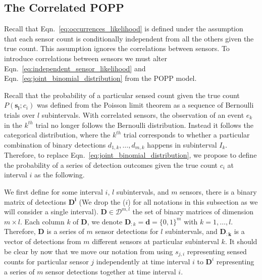 
\subsection{The Correlated POPP}
\label{subsec:cpop}

Recall that Eqn.~\ref{eq:occurrences_likelihood} is defined under the assumption that each sensor count is conditionally independent from all the others given the true count. This assumption ignores the correlations between sensors. 
% 
To introduce correlations between sensors we must alter Eqn.~\ref{eq:independent_sensor_likelihood} and
Eqn.~\ref{eq:joint_binomial_distribution} from the POPP model.


Recall that the probability of a particular sensed count given the true count $P(\mathbf{s_i} ; c_i)$ was defined from the Poisson limit theorem as a sequence of Bernoulli trials over $l$ subintervals. With correlated sensors, the observation of an event $e_k$ in the $k^{th}$ trial no longer follows the Bernoulli distribution. Instead it follows the categorical distribution, where the $k^{th}$ trial corresponds to whether a particular combination of binary detections $d_{1,k}, \ldots, d_{m,k}$ happens in subinterval $I_k$. Therefore, to replace Eqn.~\ref{eq:joint_binomial_distribution}, we propose to define the probability of a series of detection outcomes given the true count $c_i$ at interval $i$ as the following.

We first define for some interval $i$, $l$ subintervals, and $m$ sensors, there is a binary matrix of detections $\mathbf{D^i}$ (We drop the ($i$) for all notations in this subsection as we will consider a single interval). $\mathbf{D} \in \mathcal{D}^{m , l}$ the set of binary matrices of dimension $m \times l$. Each column $k$ of $\mathbf{D}$, we denote $\mathbf{D}_{:k} = \mathbf{d} = \{0, 1\}^m$ with $k = 1, \ldots, l$. Therefore, $\mathbf{D}$ is a series of $m$ sensor detections for $l$ subintervals, and $\mathbf{D_{:k}}$ is a vector of detections from $m$ different sensors at particular subinterval $k$. It should be clear by now that we move our notation from using $s_{j, i}$ representing sensed counts for particular sensor $j$ independently at time interval $i$ to $\mathbf D^{i}$ representing a series of $m$ sensor detections together at time interval $i$.

